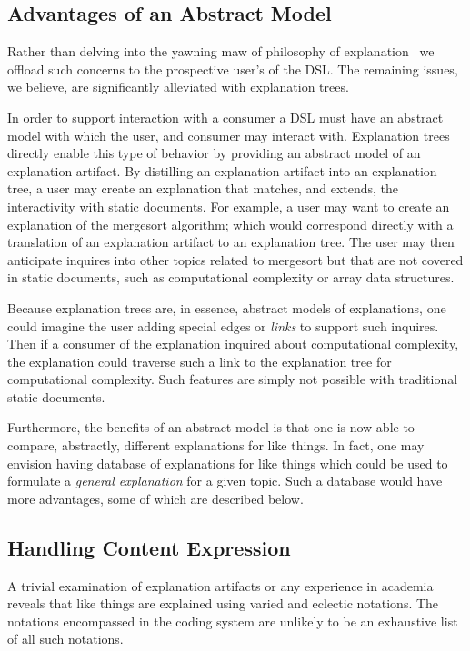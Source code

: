\documentclass[sigconf]{acmart}
\begin{document}
\subsection{Advantages of an Abstract Model}
\label{sec:dis:model}

Rather than delving into the yawning maw of philosophy of
explanation~\cite{sep-scientific-explanation} we offload such concerns to the
prospective user's of the DSL. The remaining issues, we believe, are
significantly alleviated with explanation trees.

In order to support interaction with a consumer a DSL must have an abstract
model with which the user, and consumer may interact with. Explanation trees
directly enable this type of behavior by providing an abstract model of an
explanation artifact.
%
By distilling an explanation artifact into an explanation tree, a user may
create an explanation that matches, and extends, the interactivity with static
documents. For example, a user may want to create an explanation of the
mergesort algorithm; which would correspond directly with a translation of an
explanation artifact to an explanation tree. The user may then anticipate
inquires into other topics related to mergesort but that are not covered in
static documents, such as computational complexity or array data structures.

Because explanation trees are, in essence, abstract models of explanations, one
could imagine the user adding special edges or \emph{links} to support such
inquires. Then if a consumer of the explanation inquired about computational
complexity, the explanation could traverse such a link to the explanation tree
for computational complexity. Such features are simply not possible with
traditional static documents.

Furthermore, the benefits of an abstract model is that one is now able to
compare, abstractly, different explanations for like things. In fact, one may
envision having database of explanations for like things which could be used to
formulate a \emph{general explanation} for a given topic. Such a database would
have more advantages, some of which are described below.

\subsection{Handling Content Expression}
\label{sec:dis:expr}
A trivial examination of explanation artifacts or any experience in academia
reveals that like things are explained using varied and eclectic notations. The
notations encompassed in the coding system are unlikely to be an exhaustive list
of all such notations.
\end{document}
